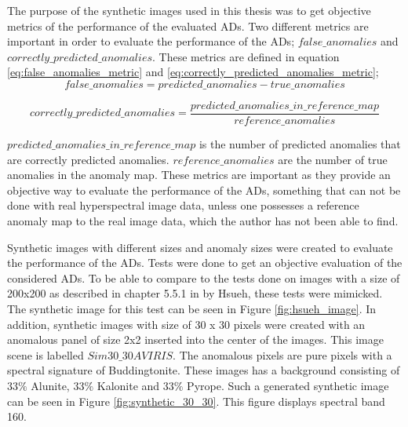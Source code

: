 The purpose of the synthetic images used in this thesis was to get objective metrics of the performance of the evaluated ADs. Two different metrics are important in order to evaluate the performance of the ADs; $false\_anomalies$ and $correctly\_predicted\_anomalies$. These metrics are defined in equation \ref{eq:false_anomalies_metric} and \ref{eq:correctly_predicted_anomalies_metric};
\begin{equation}
    false\_anomalies = predicted\_anomalies - true\_anomalies
    \label{eq:false_anomalies_metric}
\end{equation}

\begin{equation}
    correctly\_predicted\_anomalies= \frac{predicted\_anomalies\_in\_reference\_map}{reference\_anomalies}
    \label{eq:correctly_predicted_anomalies_metric}
\end{equation}

$predicted\_anomalies\_in\_reference\_map$ is the number of predicted anomalies that are correctly predicted anomalies. $reference\_anomalies$ are the number of true anomalies in the anomaly map. These metrics are important as they provide an objective way to evaluate the performance of the ADs, something that can not be done with real hyperspectral image data, unless one possesses a reference anomaly map to the real image data, which the author has not been able to find.  



Synthetic images with different sizes and anomaly sizes were created to evaluate the performance of the ADs. Tests were done to get an objective evaluation of the considered ADs. To be able to compare to the tests done on images with a size of 200x200 as described in chapter 5.5.1 in \cite{hsueh_master_thesis} by Hsueh, these tests were mimicked. The synthetic image for this test can be seen in Figure \ref{fig:hsueh_image}. In addition, synthetic images with size of 30 x 30 pixels were created with an anomalous panel of size 2x2 inserted into the center of the images. This image scene is labelled $Sim30\_30AVIRIS$. The anomalous pixels are pure pixels with a spectral signature of Buddingtonite. These images has a background consisting of $33\%$ Alunite, $33\%$ Kalonite and $33\%$ Pyrope. Such a generated synthetic image can be seen in Figure \ref{fig:synthetic_30_30}. This figure displays spectral band 160.


